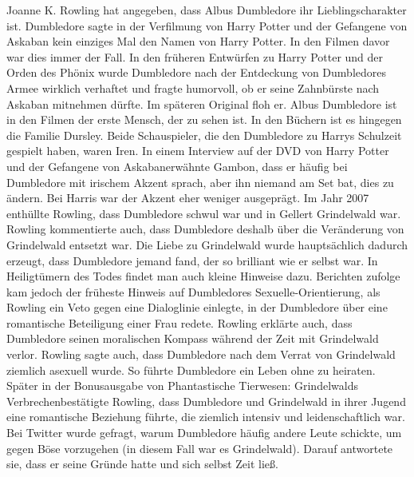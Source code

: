 \documentclass[a4paper, 10pt]{article}
\begin{document}
\vspace{10pt}
\newline
Joanne K. Rowling hat angegeben, dass Albus Dumbledore ihr Lieblingscharakter ist.
Dumbledore sagte in der Verfilmung von Harry Potter und der Gefangene von Askaban kein einziges Mal den Namen von Harry Potter. In den Filmen davor war dies immer der Fall.
In den früheren Entwürfen zu Harry Potter und der Orden des Phönix wurde Dumbledore nach der Entdeckung von Dumbledores Armee wirklich verhaftet und fragte humorvoll, ob er seine Zahnbürste nach Askaban mitnehmen dürfte. Im späteren Original floh er.
Albus Dumbledore ist in den Filmen der erste Mensch, der zu sehen ist. In den Büchern ist es hingegen die Familie Dursley.
\vspace{10pt}
\newline
Beide Schauspieler, die den Dumbledore zu Harrys Schulzeit gespielt haben, waren Iren. In einem Interview auf der DVD von Harry Potter und der Gefangene von Askabanerwähnte Gambon, dass er häufig bei Dumbledore mit irischem Akzent sprach, aber ihn niemand am Set bat, dies zu ändern. Bei Harris war der Akzent eher weniger ausgeprägt.
\vspace{10pt}
\newline
Im Jahr 2007 enthüllte Rowling, dass Dumbledore schwul war und in Gellert Grindelwald war. Rowling kommentierte auch, dass Dumbledore deshalb über die Veränderung von Grindelwald entsetzt war. Die Liebe zu Grindelwald wurde hauptsächlich dadurch erzeugt, dass Dumbledore jemand fand, der so brilliant wie er selbst war. In Heiligtümern des Todes findet man auch kleine Hinweise dazu. Berichten zufolge kam jedoch der früheste Hinweis auf Dumbledores Sexuelle-Orientierung, als Rowling ein Veto gegen eine Dialoglinie einlegte, in der Dumbledore über eine romantische Beteiligung einer Frau redete. Rowling erklärte auch, dass Dumbledore seinen moralischen Kompass während der Zeit mit Grindelwald verlor. Rowling sagte auch, dass Dumbledore nach dem Verrat von Grindelwald ziemlich asexuell wurde. So führte Dumbledore ein Leben ohne zu heiraten. Später in der Bonusausgabe von Phantastische Tierwesen: Grindelwalds Verbrechenbestätigte Rowling, dass Dumbledore und Grindelwald in ihrer Jugend eine romantische Beziehung führte, die ziemlich intensiv und leidenschaftlich war.
\vspace{10pt}
\newline
Bei Twitter wurde gefragt, warum Dumbledore häufig andere Leute schickte, um gegen Böse vorzugehen (in diesem Fall war es Grindelwald). Darauf antwortete sie, dass er seine Gründe hatte und sich selbst Zeit ließ.
\end{document}
